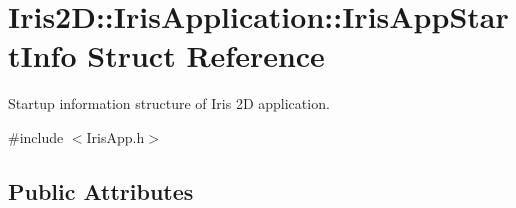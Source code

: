 \hypertarget{struct_iris2_d_1_1_iris_application_1_1_iris_app_start_info}{}\section{Iris2D\+:\+:Iris\+Application\+:\+:Iris\+App\+Start\+Info Struct Reference}
\label{struct_iris2_d_1_1_iris_application_1_1_iris_app_start_info}


Startup information structure of Iris 2D application.  




{\ttfamily \#include $<$Iris\+App.\+h$>$}

\subsection*{Public Attributes}

